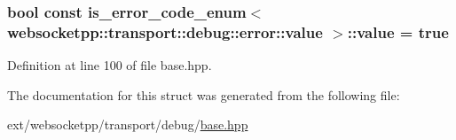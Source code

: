 \subsubsection[{value}]{\setlength{\rightskip}{0pt plus 5cm}bool const is\+\_\+error\+\_\+code\+\_\+enum$<$ {\bf websocketpp\+::transport\+::debug\+::error\+::value} $>$\+::value = true\hspace{0.3cm}{\ttfamily [static]}}\label{structis__error__code__enum_3_01websocketpp_1_1transport_1_1debug_1_1error_1_1value_01_4_a9e78f2635c2c354c3e5b479cdcdc2f0b}


Definition at line 100 of file base.\+hpp.



The documentation for this struct was generated from the following file\+:\begin{DoxyCompactItemize}
\item 
ext/websocketpp/transport/debug/\hyperlink{transport_2debug_2base_8hpp}{base.\+hpp}\end{DoxyCompactItemize}
